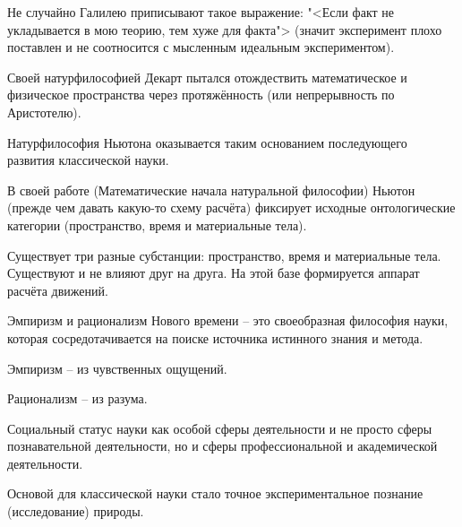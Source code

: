 \documentclass[main.tex]{subfiles}
\begin{document}



Не случайно Галилею приписывают такое выражение: "<Если факт не укладывается в мою теорию, тем хуже для факта"> (значит эксперимент плохо поставлен и не соотносится с мысленным идеальным экспериментом).



Своей натурфилософией Декарт пытался отождествить математическое и физическое пространства через протяжённость (или непрерывность по Аристотелю).



Натурфилософия Ньютона оказывается таким основанием последующего развития классической науки.

В своей работе (Математические начала натуральной философии) Ньютон (прежде чем давать какую-то схему расчёта) фиксирует исходные онтологические категории (пространство, время и материальные тела).

Существует три разные субстанции: пространство, время и материальные тела.
Существуют и не влияют друг на друга.
На этой базе формируется аппарат расчёта движений.



Эмпиризм и рационализм Нового времени -- это своеобразная философия науки, которая сосредотачивается на поиске источника истинного знания и метода.

Эмпиризм -- из чувственных ощущений.

Рационализм -- из разума.











Социальный статус науки как особой сферы деятельности и не просто сферы познавательной деятельности, но и сферы профессиональной и академической деятельности.

Основой для классической науки стало точное экспериментальное познание (исследование) природы.
\end{document}
